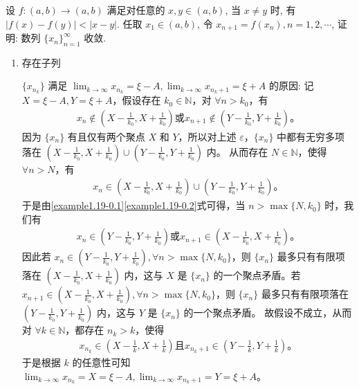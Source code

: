 \documentclass[lang=cn,newtx,10pt,scheme=chinese]{../Template/elegantbook}
\begin{document}
\begin{example}
设 $f : (a, b) \to (a, b)$ 满足对任意的 $x, y \in (a, b)$, 当 $x \neq y$ 时, 有 $\left| f(x) - f(y) \right| < \left| x - y \right|$. 任取 $x_1 \in (a, b)$, 令 $x_{n+1} = f(x_n), n = 1, 2, \cdots$, 证明: 数列 $\{x_n\}_{n=1}^{\infty}$ 收敛.
\end{example}
\begin{remark}
\begin{enumerate}[(1)]
\item \hypertarget{找相邻子列满足条件的方法证明}{存在子列} $\{x_{n_k}\}$ 满足 $\lim_{k \to \infty} x_{n_k} = \xi - A, \lim_{k \to \infty} x_{n_k+1} = \xi + A$ 的原因:
记 $X = \xi - A, Y = \xi + A$，假设存在 $k_0 \in \mathbb{N}$，对 $\forall n > k_0$，有
\begin{align}
x_n \notin (X - \frac{1}{k_0}, X + \frac{1}{k_0}) 或 x_{n+1} \notin (Y - \frac{1}{k_0}, Y + \frac{1}{k_0})。 \label{example1.19-0.1}
\end{align}
因为 $\{x_n\}$ 有且仅有两个聚点 $X$ 和 $Y$，所以对上述 $\varepsilon$，$\{x_n\}$ 中都有无穷多项落在 $(X - \frac{1}{k_0}, X + \frac{1}{k_0}) \cup (Y - \frac{1}{k_0}, Y + \frac{1}{k_0})$ 内。
从而存在 $N \in \mathbb{N}$，使得 $\forall n > N$，有
\begin{align}
x_n \in (X - \frac{1}{k_0}, X + \frac{1}{k_0}) \cup (Y - \frac{1}{k_0}, Y + \frac{1}{k_0})。 \label{example1.19-0.2}
\end{align}
于是由\eqref{example1.19-0.1}\eqref{example1.19-0.2}式可得，当 $n > \max\{N, k_0\}$ 时，我们有
\begin{align*}
x_n \in (Y - \frac{1}{k_0}, Y + \frac{1}{k_0}) 或 x_{n+1} \in (X - \frac{1}{k_0}, X + \frac{1}{k_0})。
\end{align*}
因此若 $x_n \in (Y - \frac{1}{k_0}, Y + \frac{1}{k_0}), \forall n > \max\{N, k_0\}$，则 $\{x_n\}$ 最多只有有限项落在 $(X - \frac{1}{k_0}, X + \frac{1}{k_0})$ 内，这与 $X$ 是 $\{x_n\}$ 的一个聚点矛盾。若 $x_{n+1} \in (X - \frac{1}{k_0}, X + \frac{1}{k_0}), \forall n > \max\{N, k_0\}$，则 $\{x_n\}$ 最多只有有限项落在 $(Y - \frac{1}{k_0}, Y + \frac{1}{k_0})$ 内，这与 $Y$ 是 $\{x_n\}$ 的一个聚点矛盾。
故假设不成立，从而对 $\forall k \in \mathbb{N}$，都存在 $n_k > k$，使得
\begin{align*}
x_{n_k} \in (X - \frac{1}{k}, X + \frac{1}{k}) 且 x_{n_k+1} \in (Y - \frac{1}{k}, Y + \frac{1}{k})。
\end{align*}
于是根据 $k$ 的任意性可知 $\lim_{k \to \infty} x_{n_k} = X = \xi - A, \lim_{k \to \infty} x_{n_k+1} = Y = \xi + A$。


\end{enumerate}
\end{remark}
\end{document}
